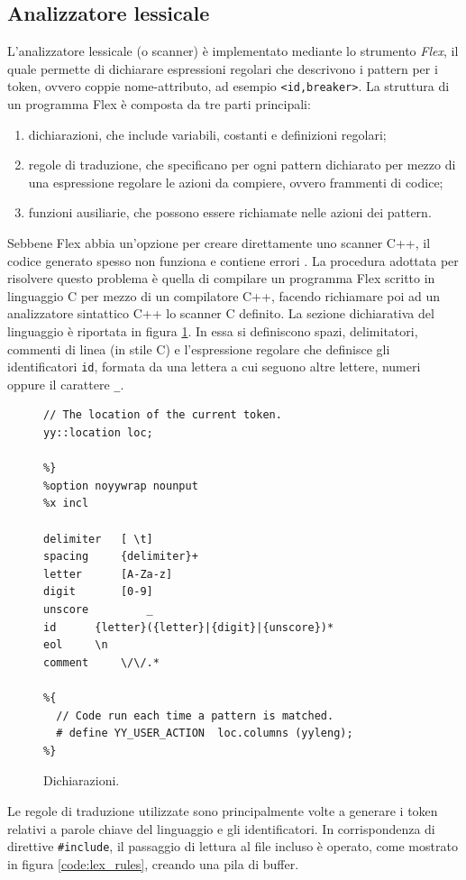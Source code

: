\subsection{Analizzatore lessicale}
L'analizzatore lessicale (o scanner) è implementato mediante lo strumento \emph{Flex}, il quale permette di dichiarare espressioni regolari che descrivono i pattern per i token, ovvero coppie nome-attributo, ad esempio \verb|<id,breaker>|. La struttura di un programma Flex  è composta da tre parti principali:
\begin{enumerate}
\item dichiarazioni, che include variabili, costanti e definizioni regolari;
\item regole di traduzione, che specificano per ogni pattern dichiarato per mezzo di una espressione regolare le azioni da compiere, ovvero frammenti di codice;
\item funzioni ausiliarie, che possono essere richiamate nelle azioni dei pattern.
\end{enumerate}
Sebbene Flex abbia un'opzione per creare direttamente uno scanner C++, il codice generato spesso non funziona e contiene errori\cite{book:bison} .
La procedura adottata per risolvere questo problema è quella di compilare un programma Flex scritto in linguaggio C per mezzo di un compilatore C++, facendo richiamare poi ad un analizzatore sintattico C++ lo scanner C definito.
La sezione dichiarativa del linguaggio è riportata in figura \ref{code:lex_decl}. In essa si definiscono spazi, delimitatori, commenti di linea (in stile C) e l'espressione regolare che definisce gli identificatori \verb|id|, formata da una lettera a cui seguono altre lettere, numeri oppure il carattere \verb|_|.

\begin{figure}[htbp]
\begin{verbatim}
// The location of the current token.
yy::location loc;

%}
%option noyywrap nounput
%x incl

delimiter	[ \t]
spacing		{delimiter}+
letter		[A-Za-z]
digit		[0-9]
unscore         _
id		{letter}({letter}|{digit}|{unscore})*
eol		\n
comment		\/\/.*

%{
  // Code run each time a pattern is matched.
  # define YY_USER_ACTION  loc.columns (yyleng);
%}
\end{verbatim}
\caption{Dichiarazioni.}
\label{code:lex_decl}
\end{figure}

Le regole di traduzione utilizzate sono principalmente volte a generare i token relativi a parole chiave del linguaggio e gli identificatori.
In corrispondenza di direttive \verb|#include|, il passaggio di lettura al file incluso è operato, come mostrato in figura \ref{code:lex_rules}, creando una pila di buffer. 

